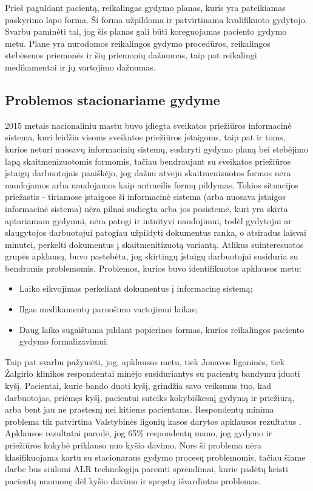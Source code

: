 Prieš paguldant pacientą, reikalingas gydymo planas, kuris yra pateikiamas paskyrimo lapo forma. Ši forma užpildoma ir patvirtinama kvalifikuoto gydytojo. Svarbu paminėti tai, jog šis planas gali būti koreguojamas paciento gydymo metu. Plane yra nurodomos reikalingos gydymo procedūros, reikalingos stebėsenos priemonės ir šių priemonių dažnumas, taip pat reikalingi medikamentai ir jų vartojimo dažnumas. 
\subsection{Problemos stacionariame gydyme}
2015 metais nacionaliniu mastu buvo įdiegta sveikatos priežiūros informacinė sistema, kuri leidžia visoms sveikatos priežiūros įstaigoms, taip pat ir toms, kurios neturi nuosavų informacinių sistemų, sudaryti gydymo planą bei stebėjimo lapą skaitmenizuotomis formomis, tačiau bendraujant su sveikatos priežiūros įstaigų darbuotojais paaiškėjo, jog dažnu atveju skaitmenizuotos formos nėra naudojamos arba naudojamos kaip antraeilis formų pildymas. Tokios situacijos priežastis - tiriamose įstaigose ši informacinė sistema (arba nuosava įstaigos informacinė sistema) nėra pilnai sudiegta arba jos posistemė, kuri yra skirta aptariamam gydymui, nėra patogi ir intuityvi naudojimui, todėl gydytojui ar slaugytojos darbuotojui patogiau užpildyti dokumentus ranka, o atsiradus laisvai minutei, perkelti dokumentus į skaitmenitizuotą variantą. Atlikus suinteresuotos grupės apklausą, buvo pastebėta, jog skirtingų įstaigų darbuotojai susiduria su bendromis problemomis. Problemos, kurios buvo identifikuotos apklausos metu: 
\begin{itemize}
    \item Laiko eikvojimas perkeliant dokumentus į informacinę sistemą;
    \item Ilgas medikamentų paruošimo vartojimui laikas;
    \item Daug laiko sugaištama pildant popierines formas, kurios reikalingos paciento gydymo formalizavimui.
\end{itemize}

Taip pat svarbu pažymėti, jog, apklausos metu, tiek Jonavos ligoninės, tiek Žalgirio klinikos respondentai minėjo susiduriantys su pacientų bandymu įduoti kyšį. Pacientai, kurie bando duoti kyšį, grindžia savo veiksmus tuo, kad darbuotojas, priėmęs kyšį, pacientui suteiks kokybiškesnį gydymą ir priežiūrą, arba bent jau ne prastesnį nei kitiems pacientams. Respondentų minima problema tik patvirtina Valstybinės ligonių kasos darytos apklausos rezultatus \cite{Kasa2016}. Apklausos rezultatai parodė, jog 65\% respondentų mano, jog gydymo ir priežiūros kokybė priklauso nuo kyšio davimo. Nors ši problema nėra klasifikuojama kartu su stacionaraus gydymo procesų problemomis, tačiau šiame darbe bus siūlomi ALR technologija paremti sprendimai, kurie padėtų keisti pacientų nuomonę dėl kyšio davimo ir spręstų išvardintas problemas.







